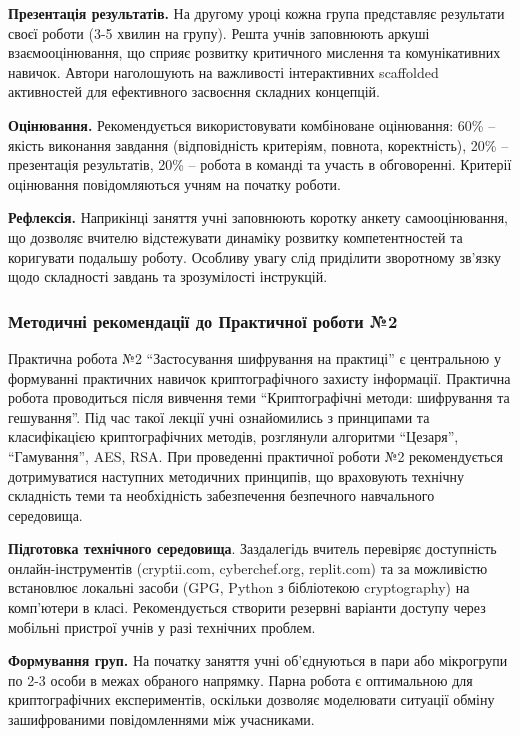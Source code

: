 \textbf{Презентація результатів.} На другому уроці кожна група представляє результати своєї роботи (3-5 хвилин на групу). Решта учнів заповнюють аркуші взаємооцінювання, що сприяє розвитку критичного мислення та комунікативних навичок. Автори \cite{Broll202315990} наголошують на важливості інтерактивних scaffolded активностей для ефективного засвоєння складних концепцій.

\textbf{Оцінювання.} Рекомендується використовувати комбіноване оцінювання: 60\% -- якість виконання завдання (відповідність критеріям, повнота, коректність), 20\% -- презентація результатів, 20\% -- робота в команді та участь в обговоренні. Критерії оцінювання повідомляються учням на початку роботи.

\textbf{Рефлексія.} Наприкінці заняття учні заповнюють коротку анкету самооцінювання, що дозволяє вчителю відстежувати динаміку розвитку компетентностей та коригувати подальшу роботу. Особливу увагу слід приділити зворотному зв'язку щодо складності завдань та зрозумілості інструкцій.


\subsubsection{Методичні рекомендації до Практичної роботи №2 }

Практична робота №2 ``Застосування шифрування на практиці'' є центральною у формуванні практичних навичок криптографічного захисту інформації. Практична робота проводиться після вивчення теми ``Криптографічні методи: шифрування та гешування''. Під час такої лекції учні ознайомились з принципами та класифікацією криптографічних методів, розглянули алгоритми ``Цезаря'', ``Гамування'', AES, RSA. При проведенні практичної роботи №2 рекомендується дотримуватися наступних методичних принципів, що враховують технічну складність теми та необхідність забезпечення безпечного навчального середовища.

\textbf{Підготовка технічного середовища}. Заздалегідь вчитель  перевіряє доступність онлайн-інструментів (cryptii.com, cyberchef.org, replit.com) та за можливістю встановлює локальні засоби (GPG, Python з бібліотекою cryptography) на комп'ютери в класі. Рекомендується створити резервні варіанти доступу через мобільні пристрої учнів у разі технічних проблем. 

\textbf{Формування груп. }На початку заняття учні об'єднуються в пари або мікрогрупи по 2-3 особи в межах обраного напрямку. Парна робота є оптимальною для криптографічних експериментів, оскільки дозволяє моделювати ситуації обміну зашифрованими повідомленнями між учасниками.  

